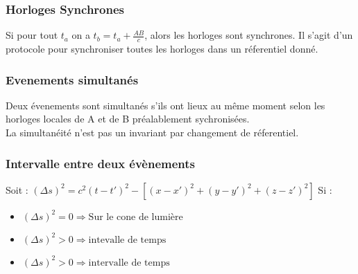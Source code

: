 \documentclass{article}
\begin{document}
\subsubsection{Horloges Synchrones}




Si pour tout $t_a$ on a $t_b = t_a + \frac{AB}{c}$, alors les horloges sont synchrones.
Il s'agit d'un protocole pour synchroniser toutes les horloges dans un réferentiel donné.
\subsubsection{Evenements simultanés}
Deux évenements sont simultanés s'ils ont lieux au même moment selon les horloges locales de A et de B préalablement sychronisées.\\
La simultanéité n'est pas un invariant par changement de réferentiel.
\subsubsection{Intervalle entre deux évènements}

Soit : $(\Delta s)^2 = c^2 (t-t')^2 - [(x-x')^2 + (y-y')^2 + (z-z')^2]$
Si : 
\begin{itemize}
    \item $(\Delta s)^2 = 0 \Rightarrow \text{Sur le cone de lumière}$
    \item $(\Delta s)^2 >0 \Rightarrow \text{intevalle de temps}$
    \item $(\Delta s)^2 > 0 \Rightarrow \text{intervalle de temps}$
\end{itemize}
\end{document}
